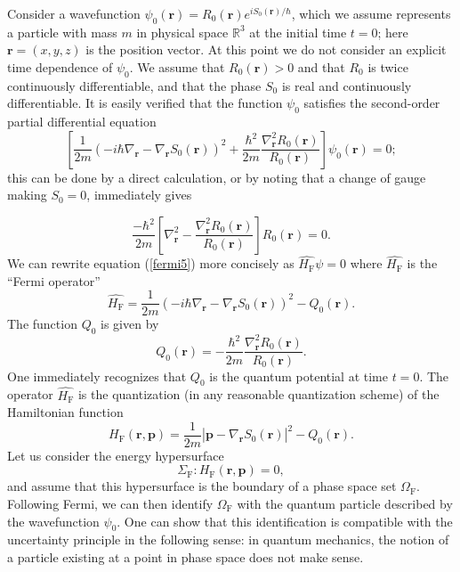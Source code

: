\documentclass[12pt]{article}%
\begin{document}
Consider a wavefunction $\psi_{0}(\mathbf{r})=R_{0}(\mathbf{r})e^{iS_{0}%
(\mathbf{r})/\hbar}$, which we assume represents a particle with mass $m$ in
physical space $\mathbb{R}^{3}$ at the initial time $t=0$; here $\mathbf{r}%
=(x,y,z)$ is the position vector. At this point we do not consider an explicit
time dependence of $\psi_{0}$. We assume that $R_{0}(\mathbf{r})>0$ and that
$R_{0}$ is twice continuously differentiable, and that the phase $S_{0}$ is
real and continuously differentiable. It is easily verified that the function
$\psi_{0}$ satisfies the second-order partial differential equation%
\begin{equation}
\left[  \frac{1}{2m}\left(  -i\hbar\nabla_{\mathbf{r}}-\nabla_{\mathbf{r}%
}S_{0}(\mathbf{r})\right)  ^{2}+\frac{\hbar^{2}}{2m}\frac{\nabla_{\mathbf{r}%
}^{2}R_{0}(\mathbf{r})}{R_{0}(\mathbf{r})}\right]  \psi_{0}(\mathbf{r})=0;
\label{fermi5}%
\end{equation}
this can be done by a direct calculation, or by noting that a change of gauge
making $S_{0}=0$, immediately gives%

\[
\frac{-\hbar^{2}}{2m}\left[  \nabla_{\mathbf{r}}^{2}-\frac{\nabla_{\mathbf{r}%
}^{2}R_{0}(\mathbf{r})}{R_{0}(\mathbf{r})}\right]  R_{0}(\mathbf{r})=0.
\]
We can rewrite equation (\ref{fermi5}) more concisely as
$\widehat{H_{\mathrm{F}}}\psi=0$ where $\widehat{H_{\mathrm{F}}}$ is the
\textquotedblleft Fermi operator\textquotedblright\
\begin{equation}
\widehat{H_{\mathrm{F}}}=\frac{1}{2m}\left(  -i\hbar\nabla_{\mathbf{r}}%
-\nabla_{\mathbf{r}}S_{0}(\mathbf{r})\right)  ^{2}-Q_{0}(\mathbf{r}).
\label{hf}%
\end{equation}
The function $Q_{0}$ is given by%
\begin{equation}
Q_{0}(\mathbf{r})=-\frac{\hbar^{2}}{2m}\frac{\nabla_{\mathbf{r}}^{2}%
R_{0}(\mathbf{r})}{R_{0}(\mathbf{r})}. \label{qpfermi1}%
\end{equation}
One immediately recognizes that $Q_{0}$ is the quantum potential at time
$t=0$. The operator $\widehat{H_{\mathrm{F}}}$ is the quantization (in any
reasonable quantization scheme) of the Hamiltonian function%
\begin{equation}
H_{\mathrm{F}}(\mathbf{r},\mathbf{p})=\frac{1}{2m}|\mathbf{p}-\nabla
_{\mathbf{r}}S_{0}(\mathbf{r})|^{2}-Q_{0}(\mathbf{r}). \label{hfcl}%
\end{equation}
Let us consider the energy hypersurface%
\begin{equation}
\Sigma_{\mathrm{F}}:H_{\mathrm{F}}(\mathbf{r},\mathbf{p})=0, \label{1}%
\end{equation}
and assume that this hypersurface is the boundary of a phase space set
$\Omega_{\mathrm{F}}$. Following Fermi, we can then identify $\Omega
_{\mathrm{F}}$ with the quantum particle described by the wavefunction
$\psi_{0}$. One can show that this identification is compatible with the
uncertainty principle in the following sense: in quantum mechanics, the notion
of a particle existing at a point in phase space does not make sense.
\end{document}
